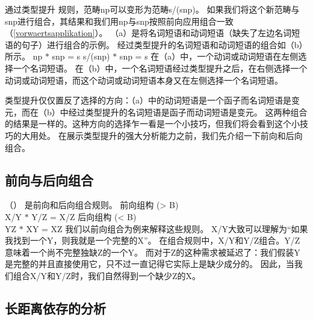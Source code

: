 通过类型提升
规则，范畴np可以变形为范畴s/(s\bs np)。
如果我们将这个新范畴与s\bs np进行组合，其结果和我们用np与s\bs np按照前向应用组合一致（\ref{vorwaertsapplikation}）。 
（a）是将名词短语和动词短语（缺失了左边名词短语的句子）进行组合的示例。
经过类型提升的名词短语和动词短语的组合如（b）所示。
\eal
\ex np $*$ s\bs np = s 
\ex s/(s\bs np) $*$ s\bs np = s
\zl
在（a）中，一个动词或动词短语在左侧选择一个名词短语。
在（b）中，一个名词短语经过类型提升之后，在右侧选择一个动词或动词短语，而这个动词或动词短语本身又在左侧选择一个名词短语。

类型提升仅仅置反了选择的方向：（a）中的动词短语是一个函子而名词短语是变元，而在（b）中经过类型提升的名词短语是函子而动词短语是变元。
这两种组合的结果是一样的。这种方向的选择乍一看是一个小技巧，但我们将会看到这个小技巧的大用处。
在展示类型提升的强大分析能力之前，我们先介绍一下前向和后向组合。 

\subsection{前向与后向组合}
\label{Kategorialgrammatik-Komposition}

（）
是前向和后向组合规则。
\eal
\ex\label{Regel-Vorwaertskomposition}
 前向组构
 (> B)\\
    X/Y $*$ Y/Z = X/Z 
\ex 后向组构
 (< B)\\
    Y\bs Z $*$ X\bs Y = X\bs Z
\zl 
我们以前向组合为例来解释这些规则。
X/Y大致可以理解为“如果我找到一个Y，则我就是一个完整的X”。
在组合规则中，X/Y和Y/Z组合。Y/Z意味着一个尚不完整独缺Z的一个Y。
而对于Z的这种需求被延迟了：我们假装Y是完整的并且直接使用它，只不过一直记得它实际上是缺少成分的。
因此，当我们组合X/Y和Y/Z时，我们自然得到一个缺少Z的X。 

\subsection{长距离依存的分析}
\label{Abschnitt-CG-UDC}

